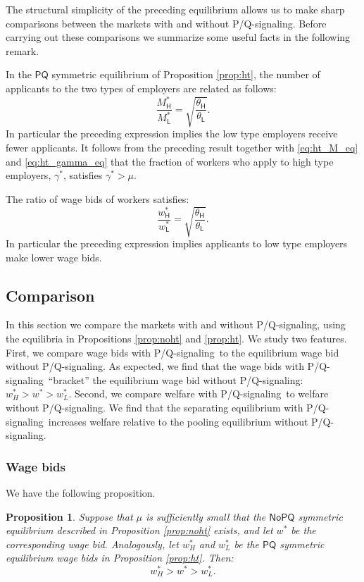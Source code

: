 \documentclass[11pt]{article}
\renewcommand{\H}{\ensuremath{\mathsf{H}}}
\renewcommand{\L}{\ensuremath{\mathsf{L}}}
\newcommand{\NoHT}{\ensuremath{\mathsf{NoPQ}}}
\newcommand{\HT}{\ensuremath{\mathsf{PQ}}}
\newtheorem{prop}{Proposition}
\newcommand{\hottowel}{P/Q-signaling}
\begin{document}
The structural simplicity of the preceding equilibrium allows us to make sharp comparisons between the markets with and without \hottowel.
Before carrying out these comparisons we summarize some useful facts in the following remark.

\begin{remark}
\label{rem:ht_notes}
In the $\HT$ symmetric equilibrium of Proposition \ref{prop:ht}, the number of applicants to the two types of employers are related as follows:
\[ \frac{M_\H^*}{M_\L^*} = \sqrt{\frac{\theta_\H}{\theta_\L}}. \]
In particular the preceding expression implies the low type employers receive fewer applicants.
It follows from the preceding result together with \eqref{eq:ht_M_eq} and \eqref{eq:ht_gamma_eq} that the fraction of workers who apply to high type employers, $\gamma^*$, satisfies $\gamma^* > \mu$.  

The ratio of wage bids of workers satisfies:
\[ \frac{w_\H^*}{w_\L^*} = \sqrt{\frac{\theta_\H}{\theta_\L}}. \]
In particular the preceding expression implies applicants to low type employers make lower wage bids.
\end{remark}

\subsection{Comparison}

In this section we compare the markets with and without \hottowel, using the equilibria in Propositions \ref{prop:noht} and \ref{prop:ht}.
We study two features.
First, we compare wage bids with \hottowel~to the equilibrium wage bid without \hottowel.
As expected, we find that the wage bids with \hottowel~``bracket'' the equilibrium wage bid without \hottowel: $w_H^* > w^* > w_L^*$.
Second, we compare welfare with \hottowel~to welfare without \hottowel.
We find that the separating equilibrium with \hottowel~increases welfare relative to the pooling equilibrium without \hottowel.

\subsubsection{Wage bids}

We have the following proposition.

\begin{prop}
\label{prop:compare_wages}
Suppose that $\mu$ is sufficiently small that the $\NoHT$ symmetric equilibrium described in Proposition \ref{prop:noht} exists, and let $w^*$ be the corresponding wage bid.
Analogously, let $w_H^*$ and $w_L^*$ be the $\HT$ symmetric equilibrium wage bids in Proposition \ref{prop:ht}.
Then:
\[ w_H^* > w^* > w_L^*. \]
\end{prop}
\end{document}
